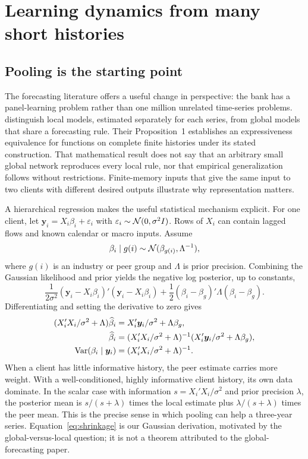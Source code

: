 \chapter{Learning dynamics from many short histories}
\label{ch:dynamics}
\section{Pooling is the starting point}
The forecasting literature offers a useful change in perspective: the bank has a panel-learning problem rather than one million unrelated time-series problems. \citet{montero2021global} distinguish local models, estimated separately for each series, from global models that share a forecasting rule. Their Proposition~1 establishes an expressiveness equivalence for functions on complete finite histories under its stated construction. That mathematical result does not say that an arbitrary small global network reproduces every local rule, nor that empirical generalization follows without restrictions. Finite-memory inputs that give the same input to two clients with different desired outputs illustrate why representation matters.

A hierarchical regression makes the useful statistical mechanism explicit. For one client, let $\bm y_i=X_i\beta_i+\varepsilon_i$ with $\varepsilon_i\sim\mathcal N(0,\sigma^2 I)$. Rows of $X_i$ can contain lagged flows and known calendar or macro inputs. Assume
\begin{equation}
\beta_i\mid g(i)\sim\mathcal N(\beta_{g(i)},\Lambda^{-1}),
\end{equation}
where $g(i)$ is an industry or peer group and $\Lambda$ is prior precision. Combining the Gaussian likelihood and prior yields the negative log posterior, up to constants,
\begin{equation}
\frac{1}{2\sigma^2}(\bm y_i-X_i\beta_i)'(\bm y_i-X_i\beta_i)
+\frac12(\beta_i-\beta_g)'\Lambda(\beta_i-\beta_g).
\end{equation}
Differentiating and setting the derivative to zero gives
\begin{align}
(X_i'X_i/\sigma^2+\Lambda)\widehat\beta_i
 &=X_i'\bm y_i/\sigma^2+\Lambda\beta_g,\\
\widehat\beta_i
 &=(X_i'X_i/\sigma^2+\Lambda)^{-1}
 (X_i'\bm y_i/\sigma^2+\Lambda\beta_g),
\label{eq:shrinkage}\\
\operatorname{Var}(\beta_i\mid\bm y_i)&=(X_i'X_i/\sigma^2+\Lambda)^{-1}.
\end{align}
When a client has little informative history, the peer estimate carries more weight. With a well-conditioned, highly informative client history, its own data dominate. In the scalar case with information $s=X_i'X_i/\sigma^2$ and prior precision $\lambda$, the posterior mean is $s/(s+\lambda)$ times the local estimate plus $\lambda/(s+\lambda)$ times the peer mean. This is the precise sense in which pooling can help a three-year series. Equation~\eqref{eq:shrinkage} is our Gaussian derivation, motivated by the global-versus-local question; it is not a theorem attributed to the global-forecasting paper.

